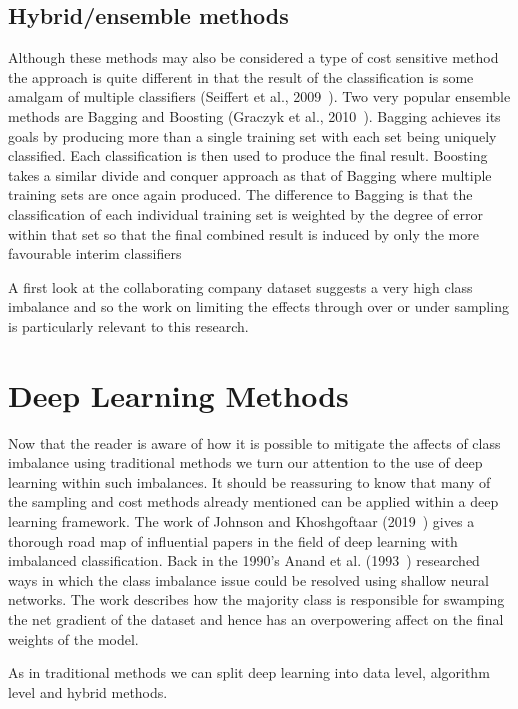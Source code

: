 

\subsection{Hybrid/ensemble methods}
Although these methods may also be considered a type of cost sensitive method the approach is quite different in that the result of the classification is some amalgam of multiple classifiers (Seiffert et al., 2009~\cite{seiffert2009rusboost}). Two very popular ensemble methods are Bagging and Boosting (Graczyk et al., 2010~\cite{graczyk2010comparison}). Bagging achieves its goals by producing more than a single training set with each set being uniquely classified. Each classification is then used to produce the final result. Boosting takes a similar divide and conquer approach as that of Bagging where multiple training sets are once again produced. The difference to Bagging is that the classification of each individual training set is weighted by the degree of error within that set so that the final combined result is induced by only the more favourable interim classifiers
\par


\par

\noindent
A first look at the collaborating company dataset suggests a very high class imbalance and so the work on limiting the effects through over or under sampling is particularly relevant to this research. 

\section{Deep Learning Methods} \label{sec:Deep}
Now that the reader is aware of how it is possible to mitigate the affects of class imbalance using traditional methods we turn our attention to the use of deep learning within such imbalances. It should be reassuring to know that many of the sampling and cost methods already mentioned can be applied within a deep learning framework. 
The work of Johnson and Khoshgoftaar (2019~\cite{johnson2019survey}) gives a thorough road map of influential papers in the field of deep learning with imbalanced classification.  
Back in the 1990's Anand et al. (1993~\cite{anand1993improved}) researched ways in which the class imbalance issue could be resolved using shallow neural networks. The work describes how the majority class is responsible for swamping the net gradient of the dataset and hence has an overpowering affect on the final weights of the model.
\par
As in traditional methods we can split deep learning into data level, algorithm level and hybrid methods.
\par
